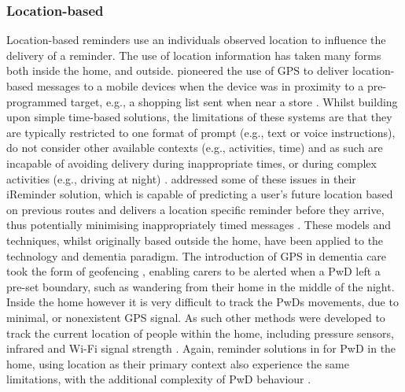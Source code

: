 \subsubsection{Location-based}
Location-based reminders use an individuals observed location to influence the delivery of a reminder. The use of location information has taken many forms both inside the home, and outside. \citeauthor{Marmasse2000} pioneered the use of GPS to deliver location-based messages to a mobile devices when the device was in proximity to a pre-programmed target, e.g., a shopping list sent when near a store \cite{Marmasse2000}.
Whilst building upon simple time-based solutions, the limitations of these systems are that they are typically restricted to one format of prompt (e.g., text or voice instructions), do not consider other available contexts (e.g., activities, time) and as such are incapable of avoiding delivery during inappropriate times, or during complex activities (e.g., driving at night) \cite{Seelye2012}. \citeauthor{Tu2013} addressed some of these issues in their iReminder solution, which is capable of predicting a user’s future location based on previous routes and delivers a location specific reminder before they arrive, thus potentially minimising inappropriately timed messages \cite{Tu2013}. These models and techniques, whilst originally based outside the home, have been applied to the technology and dementia paradigm. The introduction of GPS in dementia care took the form of geofencing \cite{Wang2015}, enabling carers to be alerted when a PwD left a pre-set boundary, such as wandering from their home in the middle of the night. Inside the home however it is very difficult to track the PwDs movements, due to minimal, or nonexistent GPS signal. As such other methods were developed to track the current location of people within the home, including pressure sensors, infrared and Wi-Fi signal strength \cite{Chen2012}. Again, reminder solutions in for PwD in the home, using location as their primary context also experience the same limitations, with the additional complexity of PwD behaviour \cite{Grunerbl2011,Lin2014a}.

